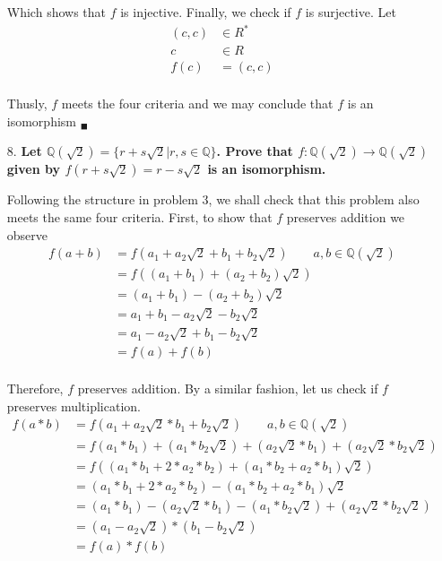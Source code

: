 \documentclass{article}
\begin{document}
\begin{enumerate}
 			Which shows that $f$ is injective. Finally, we check if $f$ is surjective. Let
 			\begin{align*}
 				(c, c) & \in R^* \\
 				c & \in R \\
 				f(c) & = (c, c) \\
 			\end{align*}

 			Thusly, $f$ meets the four criteria and we may conclude that $f$ is an isomorphism
 			$_{\blacksquare}$

		\item [8.] \textbf{Let $\mathbb{Q}(\sqrt{2}) = \lbrace r + s\sqrt{2} | r, s \in \mathbb{Q}
						   \rbrace$. Prove that $f:\mathbb{Q}(\sqrt{2}) \rightarrow 
						   \mathbb{Q}(\sqrt{2})$ given by $f(r + s\sqrt{2}) = r - s\sqrt{2}$ is an 
						   isomorphism.}

			Following the structure in problem 3, we shall check that this problem also meets the 
			same four criteria. First, to show that $f$ preserves addition we observe
			\begin{align*}
				f(a + b) & = f(a_1 + a_2\sqrt{2} + b_1 + b_2\sqrt{2}) 
										\qquad a,b \in \mathbb{Q}(\sqrt{2}) \\
						 & = f((a_1 + b_1) + (a_2 + b_2)\sqrt{2}) \\
						 & = (a_1 + b_1) - (a_2 + b_2)\sqrt{2} \\
						 & = a_1 + b_1 - a_2\sqrt{2} - b_2\sqrt{2} \\
						 & = a_1 - a_2\sqrt{2} + b_1 - b_2\sqrt{2} \\
						 & = f(a) + f(b) \\
			\end{align*}

			Therefore, $f$ preserves addition. By a similar fashion, let us check if $f$ preserves
			multiplication.
			\begin{align*}
				f(a * b) & = f(a_1 + a_2\sqrt{2} * b_1 + b_2\sqrt{2}) 
									\qquad a,b \in \mathbb{Q}(\sqrt{2}) \\
						 & = f(a_1 * b_1) + (a_1 * b_2\sqrt{2}) + (a_2\sqrt{2} * b_1) + 
						 			(a_2\sqrt{2} * b_2\sqrt{2}) \\
						 & = f((a_1 * b_1 + 2 * a_2 * b_2) + (a_1 * b_2 + a_2 * b_1)\sqrt{2}) \\
						 & = (a_1 * b_1 + 2 * a_2 * b_2) - (a_1 * b_2 + a_2 * b_1)\sqrt{2} \\
						 & = (a_1 * b_1) - (a_2\sqrt{2} * b_1) - (a_1 * b_2\sqrt{2}) + 
						 			(a_2\sqrt{2} * b_2\sqrt{2})\\
						 & = (a_1 - a_2\sqrt{2}) * (b_1 - b_2\sqrt{2}) \\
						 & = f(a) * f(b) \\
 			\end{align*}


\end{enumerate}
\end{document}
